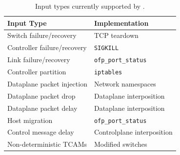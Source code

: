 \begin{table}[tb]
\centering
\footnotesize
\begin{tabular}{|l|l|}
\hline
\textbf{Input Type} & \textbf{Implementation} \\
\hline
\hline
Switch failure/recovery & TCP teardown \\
\hline
Controller failure/recovery & \verb=SIGKILL= \\
\hline
Link failure/recovery & \verb=ofp_port_status= \\
\hline
Controller partition & \verb=iptables= \\
\hline
Dataplane packet injection & Network namespaces \\
\hline
Dataplane packet drop & Dataplane interposition \\
\hline
Dataplane packet delay & Dataplane interposition \\
\hline
Host migration & \verb=ofp_port_status= \\
\hline
Control message delay & Controlplane interposition \\
\hline
Non-deterministic TCAMs & Modified switches \\
\hline
\end{tabular}
\caption{Input types currently supported by \projectname.}
\label{tab:inputs}
\vspace{-0.2cm}
\end{table}



